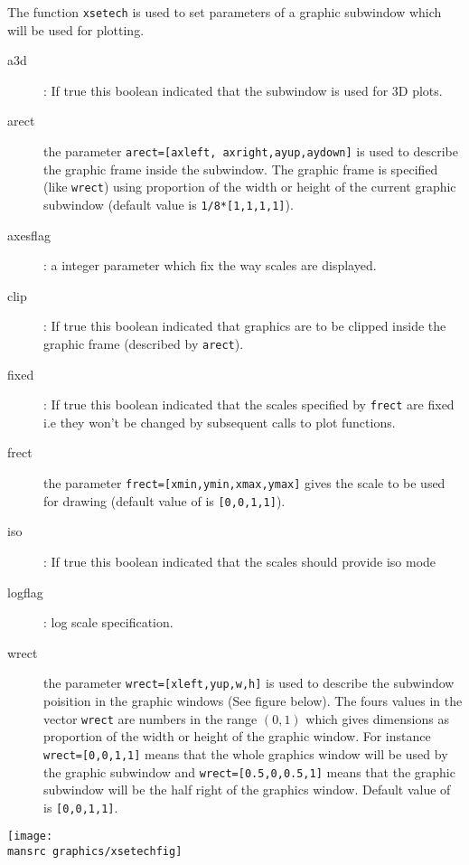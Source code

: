 \begin{mandescription}
  The function \verb!xsetech! is used to set parameters of a graphic subwindow 
  which will be used for plotting. 
  \begin{description} 
    \item[a3d]: If true this boolean indicated that the subwindow is used for 3D plots.
    \item[arect] the parameter \verb!arect=[axleft, axright,ayup,aydown]!
      is used to describe the graphic frame inside the subwindow. The graphic frame is specified (like
      \verb!wrect!) using proportion of the width or height of the current
      graphic subwindow (default value is \verb!1/8*[1,1,1,1]!). 
    \item[axesflag]: a integer parameter which fix the way scales are displayed.
    \item[clip]: If true this boolean indicated that graphics are to be clipped inside the graphic frame 
      (described by \verb!arect!).
    \item[fixed]: If true this boolean indicated that the scales specified by \verb!frect! are fixed i.e 
      they won't be changed by subsequent calls to plot functions. 
    \item[frect] the parameter \verb!frect=[xmin,ymin,xmax,ymax]! gives the scale to be used for drawing 
      (default value of is \verb![0,0,1,1]!).
    \item[iso]: If true this boolean indicated that the scales should provide iso mode 
    \item[logflag]: log scale specification.
    \item[wrect] the parameter \verb!wrect=[xleft,yup,w,h]! is used to describe the subwindow poisition 
      in the graphic windows (See figure below).  The fours values in the vector \verb!wrect! are 
      numbers in the range $(0,1)$ which gives dimensions as proportion of the width or height of the graphic window. 
      For instance \verb!wrect=[0,0,1,1]! means that the whole graphics window will be used by the graphic subwindow
      and \verb!wrect=[0.5,0,0.5,1]! means that the graphic subwindow will be the half right of the graphics window.
      Default value of is \verb![0,0,1,1]!.
    \end{description}

    \begin{center}
    \texttt{[image: \\mansrc graphics/xsetechfig]}
    \end{center}
\end{mandescription}


